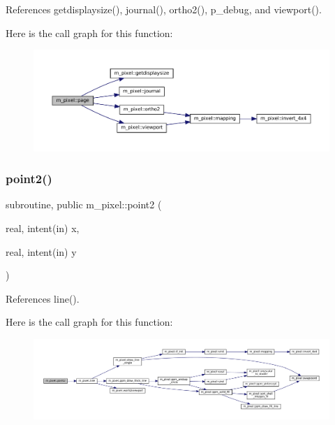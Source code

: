 References getdisplaysize(), journal(), ortho2(), p\+\_\+debug, and viewport().

Here is the call graph for this function\+:
\nopagebreak
\begin{figure}[H]
\begin{center}
\leavevmode
\includegraphics[width=350pt]{namespacem__pixel_a6733a8657ca9f51b2648690dbae258c9_cgraph}
\end{center}
\end{figure}
\mbox{\label{namespacem__pixel_a11234e0b33104eb0afb24f928b072053}} 
\subsubsection{\texorpdfstring{point2()}{point2()}}
{\footnotesize\ttfamily subroutine, public m\+\_\+pixel\+::point2 (\begin{DoxyParamCaption}\item[{real, intent(in)}]{x,  }\item[{real, intent(in)}]{y }\end{DoxyParamCaption})}



References line().

Here is the call graph for this function\+:
\nopagebreak
\begin{figure}[H]
\begin{center}
\leavevmode
\includegraphics[width=350pt]{namespacem__pixel_a11234e0b33104eb0afb24f928b072053_cgraph}
\end{center}
\end{figure}
\mbox{\label{namespacem__pixel_a5ee5c618d117b150b661e15517a3d408}} 
